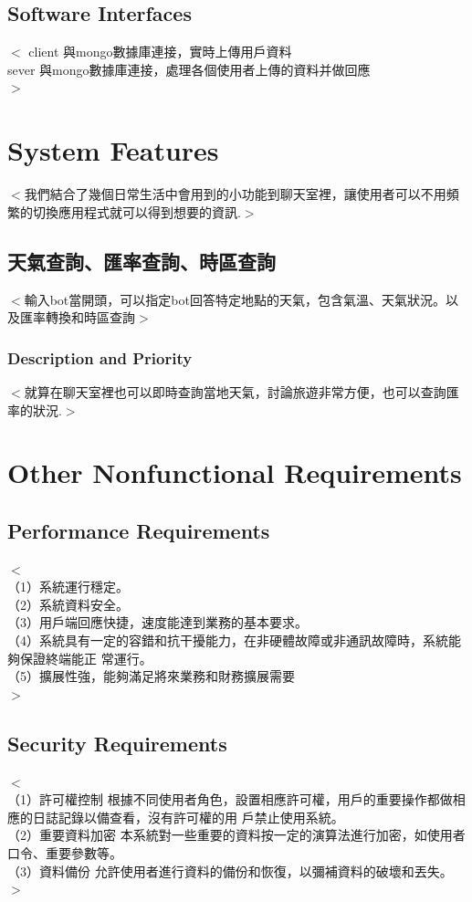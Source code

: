 \documentclass{scrreprt}
\begin{document}
\begin{CJK}{UTF8}{bkai}
\section{Software Interfaces}
$<$
	client 與mongo數據庫連接，實時上傳用戶資料\\
	sever  與mongo數據庫連接，處理各個使用者上傳的資料并做回應\\
$>$




\chapter{System Features}
$<$我們結合了幾個日常生活中會用到的小功能到聊天室裡，讓使用者可以不用頻繁的切換應用程式就可以得到想要的資訊.$>$

\section{天氣查詢、匯率查詢、時區查詢}
$<$輸入bot當開頭，可以指定bot回答特定地點的天氣，包含氣溫、天氣狀況。以及匯率轉換和時區查詢$>$

\subsection{Description and Priority}
$<$就算在聊天室裡也可以即時查詢當地天氣，討論旅遊非常方便，也可以查詢匯率的狀況.$>$





\chapter{Other Nonfunctional Requirements}

\section{Performance Requirements}
$<$\\（1）系統運行穩定。 \\
（2）系統資料安全。\\ 
（3）用戶端回應快捷，速度能達到業務的基本要求。\\ （4）系統具有一定的容錯和抗干擾能力，在非硬體故障或非通訊故障時，系統能夠保證終端能正 常運行。\\ （5）擴展性強，能夠滿足將來業務和財務擴展需要\\
$>$


\section{Security Requirements}
$<$\\（1）許可權控制 根據不同使用者角色，設置相應許可權，用戶的重要操作都做相應的日誌記錄以備查看，沒有許可權的用 戶禁止使用系統。 \\
（2）重要資料加密 本系統對一些重要的資料按一定的演算法進行加密，如使用者口令、重要參數等。\\
（3）資料備份 允許使用者進行資料的備份和恢復，以彌補資料的破壞和丟失。\\$>$


\end{CJK}
\end{document}
